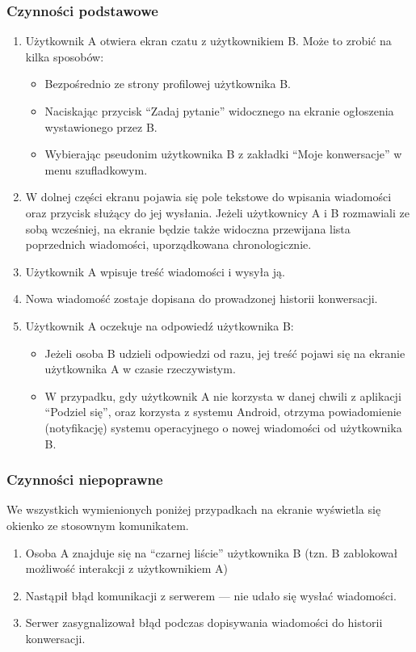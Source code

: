 \documentclass[licencjacka]{pracamgr}
\begin{document}
    \subsubsection{Czynności podstawowe}
    \begin{enumerate}
        \item Użytkownik A otwiera ekran czatu z użytkownikiem B. Może to zrobić na kilka sposobów:
        \begin{itemize}
            \item Bezpośrednio ze strony profilowej użytkownika B.
            \item Naciskając przycisk ``Zadaj pytanie'' widocznego na ekranie ogłoszenia wystawionego przez B.
            \item Wybierając pseudonim użytkownika B z zakładki ``Moje konwersacje'' w menu szufladkowym.
        \end{itemize}
        \item W dolnej części ekranu pojawia się pole tekstowe do wpisania wiadomości oraz przycisk służący do jej wysłania. Jeżeli użytkownicy A i B rozmawiali ze sobą wcześniej, na ekranie będzie także widoczna przewijana lista poprzednich wiadomości, uporządkowana chronologicznie.
        \item Użytkownik A wpisuje treść wiadomości i wysyła ją.
        \item Nowa wiadomość zostaje dopisana do prowadzonej historii konwersacji.
        \item Użytkownik A oczekuje na odpowiedź użytkownika B:\@
        \begin{itemize}
            \item Jeżeli osoba B udzieli odpowiedzi od razu, jej treść pojawi się na ekranie użytkownika A w czasie rzeczywistym.
            \item W przypadku, gdy użytkownik A nie korzysta w danej chwili z aplikacji ``Podziel się'', oraz korzysta z systemu Android, otrzyma powiadomienie (notyfikację) systemu operacyjnego o nowej wiadomości od użytkownika B.
        \end{itemize}
    \end{enumerate}
    \subsubsection{Czynności niepoprawne}
    We wszystkich wymienionych poniżej przypadkach na ekranie wyświetla się okienko ze stosownym komunikatem.
    \begin{enumerate}
        \item Osoba A znajduje się na ``czarnej liście'' użytkownika B (tzn. B zablokował możliwość interakcji z użytkownikiem A)
        \item Nastąpił błąd komunikacji z serwerem --- nie udało się wysłać wiadomości.
        \item Serwer zasygnalizował błąd podczas dopisywania wiadomości do historii konwersacji.
    \end{enumerate}
\end{document}
